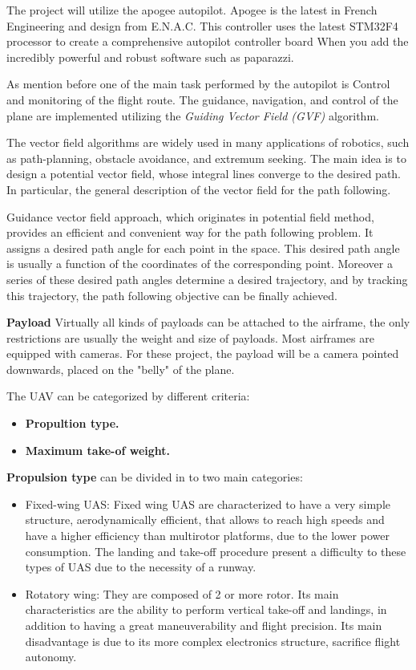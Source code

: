 The project will utilize the apogee autopilot. Apogee is the latest in French Engineering and design from E.N.A.C.  This controller uses the latest STM32F4 processor to create a comprehensive autopilot controller board  When you add the incredibly powerful and robust software such as paparazzi.\cite{apogee}

As mention before one of the main task performed by the autopilot is Control and monitoring of the flight route. The guidance, navigation, and control of the plane are implemented utilizing the \textit{Guiding Vector Field (GVF) } algorithm. 

The vector field algorithms are widely used in many
applications of robotics, such as path-planning, obstacle avoidance, and
extremum seeking. The main idea is to design a potential vector field, whose integral lines converge to the desired path. In particular, the general description of the vector field for the path following.\cite{GVF}

Guidance vector field approach, which originates in potential field method, provides an efficient and convenient way for the path following problem. It assigns a desired path angle for each point in the space. This desired path angle is usually a function of the coordinates of the corresponding point. Moreover a series of these desired path angles determine a desired trajectory, and by tracking this trajectory, the path following objective can be finally achieved.\cite{7170894}


\textbf{Payload} Virtually all kinds of payloads can be attached to the airframe, the only restrictions are usually the weight and size of payloads. Most airframes are equipped with cameras. For these project, the payload will be a camera pointed downwards, placed on the "belly" of the plane. 

The UAV can be categorized by different criteria: 
\begin{itemize}
    \item \textbf{Propultion type.}
    \item  \textbf{Maximum take-of weight.}
\end{itemize}
\textbf{Propulsion type} can be divided in to two main categories:
\begin{itemize}
\item Fixed-wing UAS: Fixed wing UAS are characterized to have a very simple structure, aerodynamically efficient, that allows to reach high speeds and have a higher efficiency than multirotor platforms, due to the lower power consumption. The landing and take-off procedure present a difficulty to these types of UAS due to the necessity of a runway.
\item Rotatory wing: They are composed of 2 or more rotor. Its main characteristics are the ability to perform vertical take-off and landings, in addition to having a great maneuverability and flight precision. Its main disadvantage is due to its more complex electronics structure, sacrifice flight autonomy.\cite{Luis_Fernadno}
\end{itemize}

